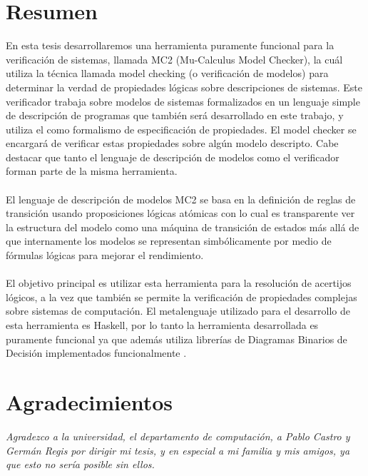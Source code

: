 % 
% 
%
\chapter*{Resumen}

\noindent En esta tesis desarrollaremos una herramienta puramente funcional para la verificación de sistemas, llamada MC2 (Mu-Calculus Model Checker), la cuál utiliza la técnica llamada model checking (o verificación de modelos) para determinar la verdad de propiedades lógicas sobre descripciones de sistemas. Este verificador trabaja sobre modelos de sistemas formalizados en un lenguaje simple de descripción de programas que también será desarrollado en este trabajo, y utiliza el {\mucalculo} como formalismo de especificación de propiedades. El model checker se encargará de verificar estas propiedades sobre algún modelo descripto. Cabe destacar que tanto el lenguaje de descripción de modelos como el verificador forman parte de la misma herramienta.\\
\\
\noindent El lenguaje de descripción de modelos MC2 se basa en la definición de reglas de transición usando proposiciones lógicas atómicas con lo cual es transparente ver la estructura del modelo como una máquina de transición de estados más allá de que internamente los modelos se representan  simbólicamente por medio de fórmulas lógicas para mejorar el rendimiento.\\
\\
\noindent El objetivo principal es utilizar esta herramienta para la resolución de acertijos lógicos, a la vez que también se permite la verificación de propiedades complejas sobre sistemas de computación. El metalenguaje utilizado para el desarrollo de esta herramienta es Haskell, por lo tanto la herramienta desarrollada es puramente funcional ya que además utiliza librerías de Diagramas Binarios de Decisión implementados funcionalmente \cite{Waldmann:6}.


\chapter*{Agradecimientos}
{\sl Agradezco a la universidad, el departamento de computación, a Pablo Castro y Germán Regis por dirigir mi tesis, y en especial a mi familia y mis amigos, ya que esto no sería posible sin ellos.}


